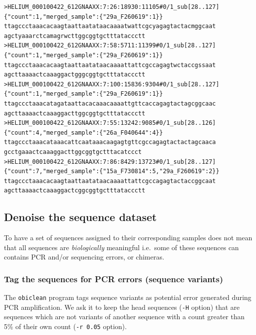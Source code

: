 \documentclass[
  letterpaper,
  DIV=11,
  numbers=noendperiod]{scrreprt}
\begin{document}
\begin{verbatim}
>HELIUM_000100422_612GNAAXX:7:26:18930:11105#0/1_sub[28..127] {"count":1,"merged_sample":{"29a_F260619":1}}
ttagccctaaacacaagtaattaatataacaaaatwattcgcyagagtactacmggcaat
agctyaaarctcamagrwcttggcggtgctttataccctt
>HELIUM_000100422_612GNAAXX:7:58:5711:11399#0/1_sub[28..127] {"count":1,"merged_sample":{"29a_F260619":1}}
ttagccctaaacacaagtaattaatataacaaaattattcgccagagtwctaccgssaat
agcttaaaactcaaaggactgggcggtgctttataccctt
>HELIUM_000100422_612GNAAXX:7:100:15836:9304#0/1_sub[28..127] {"count":1,"merged_sample":{"29a_F260619":1}}
ttagccctaaacatagataattacacaaacaaaattgttcaccagagtactagcggcaac
agcttaaaactcaaaggacttggcggtgctttataccctt
>HELIUM_000100422_612GNAAXX:7:55:13242:9085#0/1_sub[28..126] {"count":4,"merged_sample":{"26a_F040644":4}}
ttagccctaaacataaacattcaataaacaagagtgttcgccagagtactactagcaaca
gcctgaaactcaaaggacttggcggtgctttacatccct
>HELIUM_000100422_612GNAAXX:7:86:8429:13723#0/1_sub[28..127] {"count":7,"merged_sample":{"15a_F730814":5,"29a_F260619":2}}
ttagccctaaacacaagtaattaatataacaaaattattcgccagagtactaccggcaat
agcttaaaactcaaaggactcggcggtgctttataccctt
\end{verbatim}

\hypertarget{denoise-the-sequence-dataset}{%
\subsection{Denoise the sequence
dataset}\label{denoise-the-sequence-dataset}}

To have a set of sequences assigned to their corresponding samples does
not mean that all sequences are \emph{biologically} meaningful i.e.~some
of these sequences can contains PCR and/or sequencing errors, or
chimeras.

\hypertarget{tag-the-sequences-for-pcr-errors-sequence-variants}{%
\subsubsection*{Tag the sequences for PCR errors (sequence
variants)}\label{tag-the-sequences-for-pcr-errors-sequence-variants}}

The \texttt{obiclean} program tags sequence variants as potential error
generated during PCR amplification. We ask it to keep the {head}
sequences (\texttt{-H} option) that are sequences which are not variants
of another sequence with a count greater than 5\% of their own count
(\texttt{-r\ 0.05} option).
\end{document}
